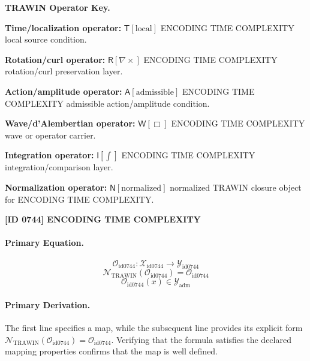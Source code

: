 \par\vspace{0.45\baselineskip}
\noindent\begin{minipage}[t]{\linewidth}
\begingroup
\small
\raggedright
\textbf{TRAWIN Operator Key.}\par
\noindent\textbf{Time/localization operator:} $\mathsf{T}\!\left[\mathrm{local}\right]$ ENCODING TIME COMPLEXITY local source condition.\par
\noindent\textbf{Rotation/curl operator:} $\mathsf{R}\!\left[\nabla\times\right]$ ENCODING TIME COMPLEXITY rotation/curl preservation layer.\par
\noindent\textbf{Action/amplitude operator:} $\mathsf{A}\!\left[\mathrm{admissible}\right]$ ENCODING TIME COMPLEXITY admissible action/amplitude condition.\par
\noindent\textbf{Wave/d'Alembertian operator:} $\mathsf{W}\!\left[\Box\right]$ ENCODING TIME COMPLEXITY wave or operator carrier.\par
\noindent\textbf{Integration operator:} $\mathsf{I}\!\left[\int\right]$ ENCODING TIME COMPLEXITY integration/comparison layer.\par
\noindent\textbf{Normalization operator:} $\mathsf{N}\!\left[\mathrm{normalized}\right]$ normalized TRAWIN closure object for ENCODING TIME COMPLEXITY.\par
\endgroup
\end{minipage}

\clearpage
\noindent\textbf{[ID 0744] ENCODING TIME COMPLEXITY}\par
\vspace{0.35em}
\paragraph{Primary Equation.}
\[
\mathcal{O}_{\mathrm{id0744}}:\mathcal{X}_{\mathrm{id0744}}\longrightarrow\mathcal{Y}_{\mathrm{id0744}}
\]
\[
\mathcal{N}_{\mathrm{TRAWIN}}(\mathcal{O}_{\mathrm{id0744}})=\mathcal{O}_{\mathrm{id0744}}
\]
\[
\mathcal{O}_{\mathrm{id0744}}(x)\in\mathcal{Y}_{\mathrm{adm}}
\]

\paragraph{Primary Derivation.}
The first line specifies a map, while the subsequent line provides its explicit form \( \mathcal{N}_{\mathrm{TRAWIN}}(\mathcal{O}_{\mathrm{id0744}})=\mathcal{O}_{\mathrm{id0744}} \). Verifying that the formula satisfies the declared mapping properties confirms that the map is well defined.
